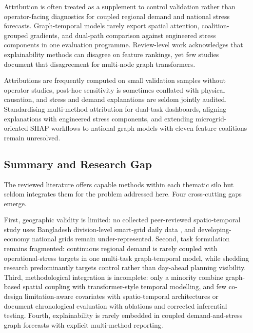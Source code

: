 Attribution is often treated as a supplement to control validation rather than operator-facing diagnostics for coupled regional demand and national stress forecasts. Graph-temporal models rarely export spatial attention, coalition-grouped gradients, and dual-path comparison against engineered stress components in one evaluation programme. Review-level work \cite{Baur2024XAIReview} acknowledges that explainability methods can disagree on feature rankings, yet few studies document that disagreement for multi-node graph transformers.

Attributions are frequently computed on small validation samples without operator studies, post-hoc sensitivity is sometimes conflated with physical causation, and stress and demand explanations are seldom jointly audited. Standardising multi-method attribution for dual-task dashboards, aligning explanations with engineered stress components, and extending microgrid-oriented SHAP workflows to national graph models with eleven feature coalitions remain unresolved.

\subsection{Summary and Research Gap}\label{subsection:summary_and_research_gap}

The reviewed literature offers capable methods within each thematic silo but seldom integrates them for the problem addressed here. Four cross-cutting gaps emerge.

First, geographic validity is limited: no collected peer-reviewed spatio-temporal study uses Bangladesh division-level smart-grid daily data \cite{Hossain2025BangladeshSmartGrid}, and developing-economy national grids remain under-represented. Second, task formulation remains fragmented: continuous regional demand is rarely coupled with operational-stress targets in one multi-task graph-temporal model, while shedding research predominantly targets control rather than day-ahead planning visibility. Third, methodological integration is incomplete: only a minority combine graph-based spatial coupling with transformer-style temporal modelling, and few co-design limitation-aware covariates with spatio-temporal architectures or document chronological evaluation with ablations and corrected inferential testing. Fourth, explainability is rarely embedded in coupled demand-and-stress graph forecasts with explicit multi-method reporting.

